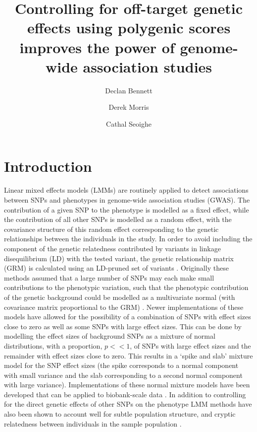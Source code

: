 \documentclass[fleqn,10pt]{wlscirep}
\title{Controlling for off-target genetic effects using polygenic scores improves the power of genome-wide association studies}
\author[1,]{Declan Bennett}
\author[2]{Derek Morris}
\author[1,*]{Cathal Seoighe}
\affil[1]{National University of Ireland, Galway, School of mathematics, Statistics and applied Mathematics, Galway, H91 TK33, Ireland}
\affil[2]{National University of Ireland, Galway, Department of Biochemistry, Galway, H91 TK33, Ireland}
\affil[*]{cathal.seoighe@nuigalway.ie}
\begin{document}
\flushbottom
\maketitle


\doublespacing
\linenumbers
\section*{Introduction}

Linear mixed effects models (LMMs) are routinely applied to detect associations between SNPs and phenotypes in genome-wide association studies (GWAS). The contribution of a given SNP to the phenotype is modelled as a fixed effect, while the contribution of all other SNPs is modelled as a random effect, with the covariance structure of this random effect corresponding to the genetic relationships between the individuals in the study. In order to avoid including the component of the genetic relatedness contributed by variants in linkage disequilibrium (LD) with the tested variant, the genetic relationship matrix (GRM) is calculated using an LD-pruned set of variants \cite{yu2006unified,emma}. Originally these methods assumed that a large number of SNPs may each make small contributions to the phenotypic variation, such that the phenotypic contribution of the genetic background could be modelled as a multivariate normal (with covariance matrix proportional to the GRM) \cite{emma, emmax,gemma,fastlmm}. Newer implementations of these models have allowed for the possibility of a combination of SNPs with effect sizes close to zero as well as some SNPs with large effect sizes. This can be done by modelling the effect sizes of background SNPs as a mixture of normal distributions, with a proportion, $p << 1$, of SNPs with large effect sizes and the remainder with effect sizes close to zero. This results in a ‘spike and slab’ mixture model for the SNP effect sizes \cite{BOLT} (the spike corresponds to a normal component with small variance and the slab corresponding to a second normal component with large variance). Implementations of these normal mixture models have been developed that can be applied to biobank-scale data \cite{boltukb}. In addition to controlling for the direct genetic effects of other SNPs on the phenotype LMM methods have also been shown to account well for subtle population structure, and cryptic relatedness between individuals in the sample population \cite{yu2006unified,emma,emmax,gemma,price2010new}.  
\par\par
\end{document}
